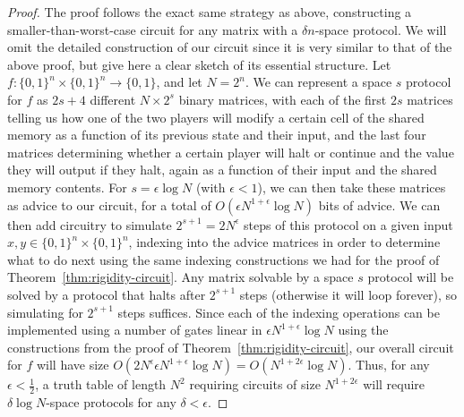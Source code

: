 \documentclass[11pt]{article}
\begin{document}
\begin{proof}
The proof follows the exact same strategy as above, constructing a smaller-than-worst-case circuit for any matrix with a $\delta n$-space protocol. We will omit the detailed construction of our circuit since it is very similar to that of the above proof, but give here a clear sketch of its essential structure. Let $f: \{0,1\}^n \times \{0,1\}^n \rightarrow \{0,1\}$, and let $N = 2^n$. We can represent a space $s$ protocol for $f$ as $2s + 4$ different $N \times 2^s$ binary matrices, with each of the first $2s$ matrices telling us how one of the two players will modify a certain cell of the shared memory as a function of its previous state and their input, and the last four matrices determining whether a certain player will halt or continue and the value they will output if they halt, again as a function of their input and the shared memory contents. For $s = \epsilon \log N$ (with $\epsilon < 1$), we can then take these matrices as advice to our circuit, for a total of $O(\epsilon N^{1 + \epsilon} \log N)$ bits of advice. We can then add circuitry to simulate $2^{s+1} = 2N^{\epsilon}$ steps of this protocol on a given input $x,y \in \{0,1\}^n \times \{0,1\}^n$, indexing into the advice matrices in order to determine what to do next using the same indexing constructions we had for the proof of Theorem~\ref{thm:rigidity-circuit}. Any matrix solvable by a space $s$ protocol will be solved by a protocol that halts after $2^{s+1}$ steps (otherwise it will loop forever), so simulating for $2^{s+1}$ steps suffices. Since each of the indexing operations can be implemented using a number of gates linear in $\epsilon N^{1 + \epsilon} \log N$ using the constructions from the proof of Theorem~\ref{thm:rigidity-circuit}, our overall circuit for $f$ will have size $O(2N^{\epsilon}\epsilon N^{1 + \epsilon} \log N) = O(N^{1 + 2\epsilon} \log N)$. Thus, for any $\epsilon < \frac{1}{2}$, a truth table of length $N^2$ requiring circuits of size $N^{1 + 2\epsilon}$ will require $\delta \log N$-space protocols for any $\delta < \epsilon$.
\end{proof}
\end{document}
